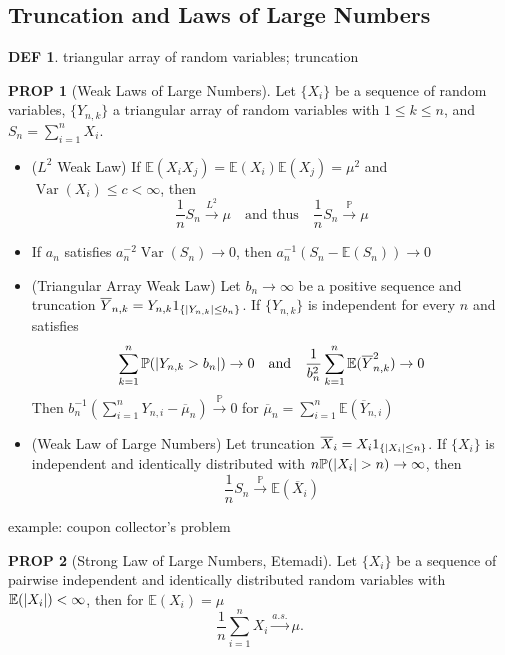 \documentclass[hidelinks,11pt]{article}
\theoremstyle{definition}
\newtheorem*{defin}{DEF}
\theoremstyle{dotles}
\theoremstyle{dotless}
\newtheorem{prop}{PROP}[section]
\theoremstyle{remark}
\DeclareMathOperator{\Var}{Var}
\begin{document}
\subsection{Truncation and Laws of Large Numbers}

\begin{defin}
triangular array of random variables; truncation
\end{defin}

\begin{prop}[Weak Laws of Large Numbers]
Let $\{X_i\}$ be a sequence of random variables, $\{Y_{n,k}\}$ a triangular array of random variables with $1\leq k\leq n$, and $S_n=\sum_{i=1}^nX_i$.
\begin{itemize}
    \item \textup{($L^2$ Weak Law)} If $\mathbb{E}(X_iX_j)=\mathbb{E}(X_i)\mathbb{E}(X_j)=\mu^2$ and $\Var(X_i)\leq c<\infty$, then
    \[\frac{1}{n}S_n\xrightarrow{L^2}\mu\quad\textrm{and thus}\quad\frac{1}{n}S_n\xrightarrow{\mathbb{P}}\mu\]
    \item If $a_n$ satisfies $a_n^{-2}\Var(S_n)\to0$, then $a_n^{-1}(S_n-\mathbb{E}(S_n))\to0$
    \item \textup{(Triangular Array Weak Law)} Let $b_n\to\infty$ be a positive sequence and truncation $\overline{Y}_{n,k}=Y_{n,k}1_{\{\abs{Y_{n,k}}\leq b_n\}}$. If $\{Y_{n,k}\}$ is independent for every $n$ and satisfies
    \[\sum_{k=1}^n\mathbb{P}(\abs{Y_{n,k}>b_n})\to0\quad\textrm{and}\quad\frac{1}{b_n^2}\sum_{k=1}^n\mathbb{E}(\overline{Y}_{n,k}^2)\to0\]
    Then $b_n^{-1}(\sum_{i=1}^nY_{n,i}-\overline{\mu}_n)\xrightarrow{\mathbb{P}}0$ for $\overline{\mu}_n=\sum_{i=1}^n\mathbb{E}(\overline{Y}_{n,i})$
    \item \textup{(Weak Law of Large Numbers)} Let truncation $\overline{X}_i=X_i1_{\{\abs{X_i}\leq n\}}$. If $\{X_i\}$ is independent and identically distributed with $n\mathbb{P}(\abs{X_i}>n)\to\infty$, then
    \[\frac{1}{n}S_n\xrightarrow{\mathbb{P}}\mathbb{E}(\overline{X}_i)\]
\end{itemize}
\end{prop}

example: coupon collector's problem

\begin{prop}[Strong Law of Large Numbers, Etemadi]
Let $\{X_i\}$ be a sequence of pairwise independent and identically distributed random variables with $\mathbb{E}(\abs{X_i})<\infty$, then for $\mathbb{E}(X_i)=\mu$
\[\frac{1}{n}\sum_{i=1}^nX_i\xrightarrow{a.s.}\mu.\]
\end{prop}
\end{document}
